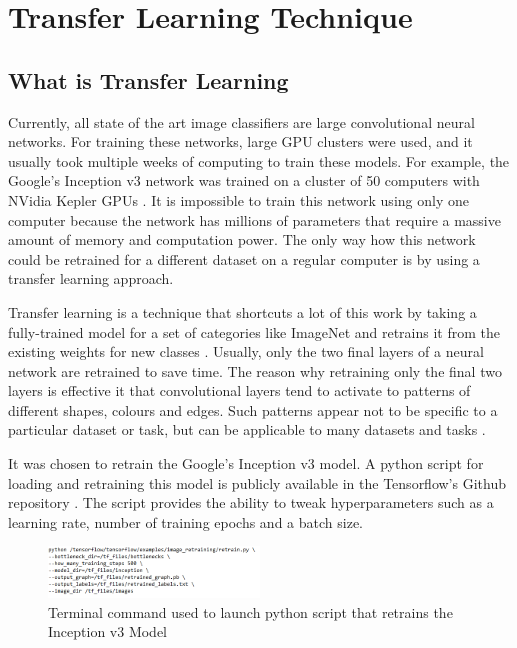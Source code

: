 \section{Transfer Learning Technique}

\subsection{What is Transfer Learning}

Currently, all state of the art image classifiers are large convolutional neural networks.  For training these networks, large GPU clusters were used, and it usually took multiple weeks of computing to train these models. For example,  the Google's Inception v3 network was trained on a cluster of  50 computers with  NVidia Kepler GPUs \cite{incept}. It is impossible to train this network using only one computer because the network has millions of parameters that require a massive amount of memory and computation power. The only way how this network could be retrained for a different dataset on a regular computer is by using a transfer learning approach. 

Transfer learning is a technique that shortcuts a lot of this work by taking a fully-trained model for a set of categories like ImageNet and retrains it from the existing weights for new classes \cite{tensorflow}. Usually, only the two final layers of a neural network are retrained to save time. The reason why retraining only the final two layers is effective it that convolutional layers tend to activate to patterns of different shapes, colours and edges. Such patterns appear not to be specific to a particular dataset or task, but can be applicable to many datasets and tasks \cite{transfer}.

It was chosen to retrain the Google's Inception v3 model. A python script for loading and retraining this model is publicly available in the Tensorflow's Github repository \cite{gitretrain}. The script provides the ability to tweak hyperparameters such as a learning rate, number of training epochs and a batch size. 


\begin{figure}[h]
\centering
\includegraphics[width=0.5\textwidth]{Figures/4/term.PNG}
\caption{Terminal command used to launch python script that retrains the Inception v3 Model}
\label{fig:retrain}
\end{figure}

